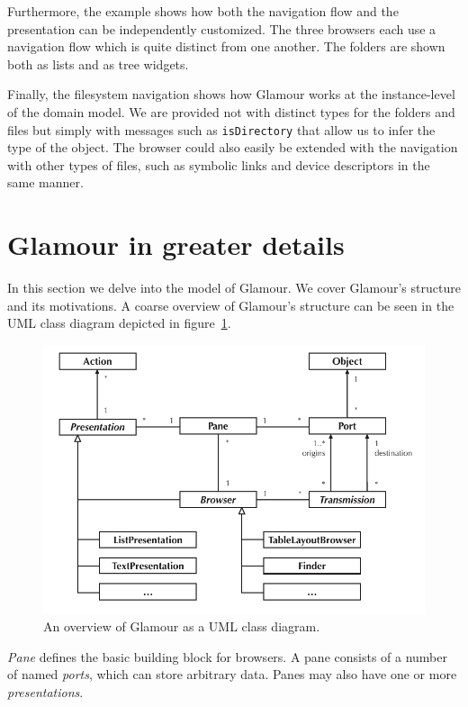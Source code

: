 \documentclass[a4paper,10pt,twoside]{book}
\begin{document}
Furthermore, the example shows how both the navigation flow and the presentation can be independently customized. The three browsers each use a navigation flow which is quite distinct from one another. The folders are shown both as lists and as tree widgets.

Finally, the filesystem navigation shows how Glamour works at the instance-level of the domain model. We are provided not with distinct types for the folders and files but simply with messages such as \texttt{isDirectory} that allow us to infer the type of the object. The browser could also easily be extended with the navigation with other types of files, such as symbolic links and device descriptors in the same manner.


\section{Glamour in greater details}

In this section we delve into the model of Glamour. We cover Glamour's
structure and its motivations. A coarse overview of Glamour's
structure can be seen in the UML class diagram depicted in
figure~\ref{fig:uml-overview}.

\begin{figure}[htbp]
\centerline{\includegraphics[width=\linewidth]{class_diagram.pdf}}
\caption{An overview of Glamour as a UML class diagram.}
\label{fig:uml-overview}
\end{figure}

\emph{Pane} defines the basic building block for browsers. A pane
consists of a number of named \emph{ports}, which can store arbitrary
data. Panes may also have one or more \emph{presentations}.
\end{document}
